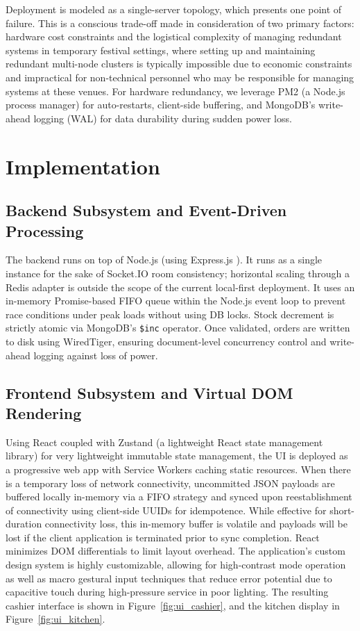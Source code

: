 \documentclass[conference]{IEEEtran}
\begin{document}
Deployment is modeled as a single-server topology, which presents one point of failure. This is a conscious trade-off made in consideration of two primary factors: hardware cost constraints and the logistical complexity of managing redundant systems in temporary festival settings, where setting up and maintaining redundant multi-node clusters is typically impossible due to economic constraints and impractical for non-technical personnel who may be responsible for managing systems at these venues. For hardware redundancy, we leverage PM2 (a Node.js process manager) for auto-restarts, client-side buffering, and MongoDB's write-ahead logging (WAL) for data durability during sudden power loss.

\section{Implementation}

\subsection{Backend Subsystem and Event-Driven Processing}

The backend runs on top of Node.js (using Express.js \cite{kooli2021energy}). It runs as a single instance for the sake of Socket.IO room consistency; horizontal scaling through a Redis adapter is outside the scope of the current local-first deployment. It uses an in-memory Promise-based FIFO queue within the Node.js event loop to prevent race conditions under peak loads without using DB locks. Stock decrement is strictly atomic via MongoDB's \texttt{\$inc} operator. Once validated, orders are written to disk using WiredTiger, ensuring document-level concurrency control and write-ahead logging against loss of power.

\subsection{Frontend Subsystem and Virtual DOM Rendering}

Using React coupled with Zustand (a lightweight React state management library) for very lightweight immutable state management, the UI is deployed as a progressive web app with Service Workers caching static resources. When there is a temporary loss of network connectivity, uncommitted JSON payloads are buffered locally in-memory via a FIFO strategy and synced upon reestablishment of connectivity using client-side UUIDs for idempotence. While effective for short-duration connectivity loss, this in-memory buffer is volatile and payloads will be lost if the client application is terminated prior to sync completion. React minimizes DOM differentials to limit layout overhead. The application's custom design system is highly customizable, allowing for high-contrast mode operation as well as macro gestural input techniques that reduce error potential due to capacitive touch during high-pressure service in poor lighting. The resulting cashier interface is shown in Figure~\ref{fig:ui_cashier}, and the kitchen display in Figure~\ref{fig:ui_kitchen}.
\end{document}
